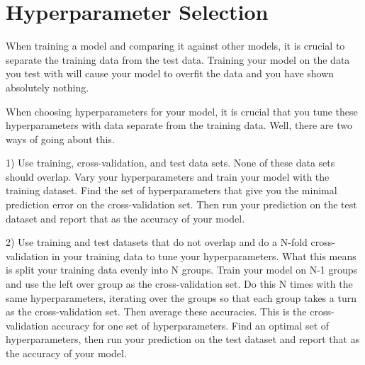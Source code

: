 \documentclass[11pt]{article}
\begin{document}
\section{Hyperparameter Selection} \label{sec:hyperparameters}
When training a model and comparing it against other models, it is crucial to separate the training data from the test data. Training your model on the data you test with will cause your model to overfit the data and you have shown absolutely nothing.

When choosing hyperparameters for your model, it is crucial that you tune these hyperparameters with data separate from the training data. Well, there are two ways of going about this.

1) Use training, cross-validation, and test data sets. None of these data sets should overlap. Vary your hyperparameters and train your model with the training dataset. Find the set of hyperparameters that give you the minimal prediction error on the cross-validation set. Then run your prediction on the test dataset and report that as the accuracy of your model.

2) Use training and test datasets that do not overlap and do a N-fold cross-validation in your training data to tune your hyperparameters. What this means is split your training data evenly into N groups. Train your model on N-1 groups and use the left over group as the cross-validation set. Do this N times with the same hyperparameters, iterating over the groups so that each group takes a turn as the cross-validation set. Then average these accuracies. This is the cross-validation accuracy for one set of hyperparameters. Find an optimal set of hyperparameters, then run your prediction on the test dataset and report that as the accuracy of your model.
\end{document}
